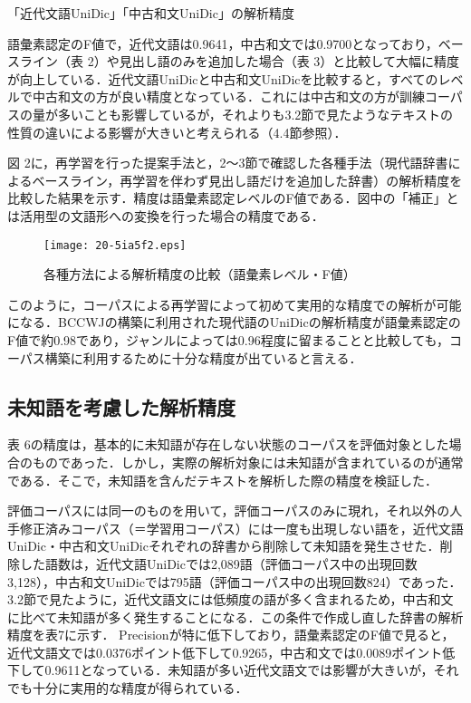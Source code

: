 \documentclass[japanese]{jnlp_1.4}
\begin{document}
\begin{table}[b]
\caption{「近代文語UniDic」「中古和文UniDic」の解析精度}
\label{tab6}

\end{table}

語彙素認定のF値で，近代文語は0.9641，中古和文では0.9700となっており，ベースライン（表 2）や見出し語のみを追加した場合（表 3）と比較して大幅に精度が向上している．近代文語UniDicと中古和文UniDicを比較すると，すべてのレベルで中古和文の方が良い精度となっている．これには中古和文の方が訓練コーパスの量が多いことも影響しているが，それよりも3.2節で見たようなテキストの性質の違いによる影響が大きいと考えられる（4.4節参照）．

図 2に，再学習を行った提案手法と，2〜3節で確認した各種手法（現代語辞書によるベースライン，再学習を伴わず見出し語だけを追加した辞書）の解析精度を比較した結果を示す．精度は語彙素認定レベルのF値である．図中の「補正」とは活用型の文語形への変換を行った場合の精度である．

\begin{figure}[t]
\begin{center}
\texttt{[image: 20-5ia5f2.eps]}
\end{center}
\caption{各種方法による解析精度の比較（語彙素レベル・F値）}
\label{fig2}
\end{figure}

このように，コーパスによる再学習によって初めて実用的な精度での解析が可能になる．BCCWJの構築に利用された現代語のUniDicの解析精度が語彙素認定のF値で約0.98であり，ジャンルによっては0.96程度に留まることと比較しても，コーパス構築に利用するために十分な精度が出ていると言える．



\subsection{未知語を考慮した解析精度}

表 6の精度は，基本的に未知語が存在しない状態のコーパスを評価対象とした場合のものであった．しかし，実際の解析対象には未知語が含まれているのが通常である．そこで，未知語を含んだテキストを解析した際の精度を検証した．

評価コーパスには同一のものを用いて，評価コーパスのみに現れ，それ以外の人手修正済みコーパス（＝学習用コーパス）には一度も出現しない語を，近代文語UniDic・中古和文UniDicそれぞれの辞書から削除して未知語を発生させた．削除した語数は，近代文語UniDicでは2,089語（評価コーパス中の出現回数3,128），中古和文UniDicでは795語（評価コーパス中の出現回数824）であった．3.2節で見たように，近代文語文には低頻度の語が多く含まれるため，中古和文に比べて未知語が多く発生することになる．この条件で作成し直した辞書の解析精度を表7に示す．
Precisionが特に低下しており，語彙素認定のF値で見ると，近代文語文では0.0376ポイント低下して0.9265，中古和文では0.0089ポイント低下して0.9611となっている．未知語が多い近代文語文では影響が大きいが，それでも十分に実用的な精度が得られている．
\end{document}
